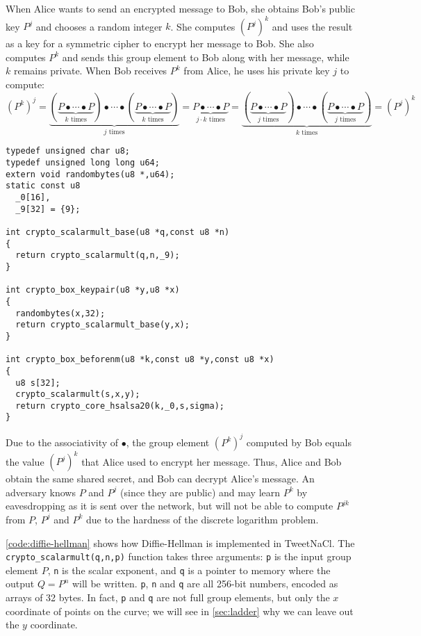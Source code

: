 \documentclass{article}
\begin{document}
When Alice wants to send an encrypted message to Bob, she obtains Bob's public key $P^j$ and chooses a random integer $k$.
She computes $(P^j)^k$ and uses the result as a key for a symmetric cipher to encrypt her message to Bob.
She also computes $P^k$ and sends this group element to Bob along with her message, while $k$ remains private.
When Bob receives $P^k$ from Alice, he uses his private key $j$ to compute:
\begin{equation*}
(P^k)^j =
\underbrace{(\underbrace{P \bullet\cdots\bullet P}_\text{$k$ times}) \bullet\cdots\bullet (\underbrace{P \bullet\cdots\bullet P}_\text{$k$ times})}_\text{$j$ times} =
\underbrace{P \bullet\cdots\bullet P}_\text{$j \cdot k$ times} =
\underbrace{(\underbrace{P \bullet\cdots\bullet P}_\text{$j$ times}) \bullet\cdots\bullet (\underbrace{P \bullet\cdots\bullet P}_\text{$j$ times})}_\text{$k$ times} =
(P^j)^k
\end{equation*}

\begin{listing}
\begin{verbatim}
typedef unsigned char u8;
typedef unsigned long long u64;
extern void randombytes(u8 *,u64);
static const u8
  _0[16],
  _9[32] = {9};

int crypto_scalarmult_base(u8 *q,const u8 *n)
{ 
  return crypto_scalarmult(q,n,_9);
}

int crypto_box_keypair(u8 *y,u8 *x)
{
  randombytes(x,32);
  return crypto_scalarmult_base(y,x);
}

int crypto_box_beforenm(u8 *k,const u8 *y,const u8 *x)
{
  u8 s[32];
  crypto_scalarmult(s,x,y);
  return crypto_core_hsalsa20(k,_0,s,sigma);
}
\end{verbatim}
\caption{Using the \texttt{crypto{\PYGZus}scalarmult} function to implement Diffie-Hellman in TweetNaCl}\label{code:diffie-hellman}
\end{listing}

Due to the associativity of $\bullet$, the group element $(P^k)^j$ computed by Bob equals the value $(P^j)^k$ that Alice used to encrypt her message.
Thus, Alice and Bob obtain the same shared secret, and Bob can decrypt Alice's message.
An adversary knows $P$ and $P^j$ (since they are public) and may learn $P^k$ by eavesdropping as it is sent over the network, but will not be able to compute $P^{jk}$ from $P$, $P^j$ and $P^k$ due to the hardness of the discrete logarithm problem.

\autoref{code:diffie-hellman} shows how Diffie-Hellman is implemented in TweetNaCl.
The \verb|crypto_scalarmult(q,n,p)| function takes three arguments: \verb|p| is the input group element $P$, \verb|n| is the scalar exponent, and \verb|q| is a pointer to memory where the output $Q=P^n$ will be written.
\verb|p|, \verb|n| and \verb|q| are all 256-bit numbers, encoded as arrays of 32 bytes.
In fact, \verb|p| and \verb|q| are not full group elements, but only the $x$ coordinate of points on the curve; we will see in \autoref{sec:ladder} why we can leave out the $y$ coordinate.
\end{document}
